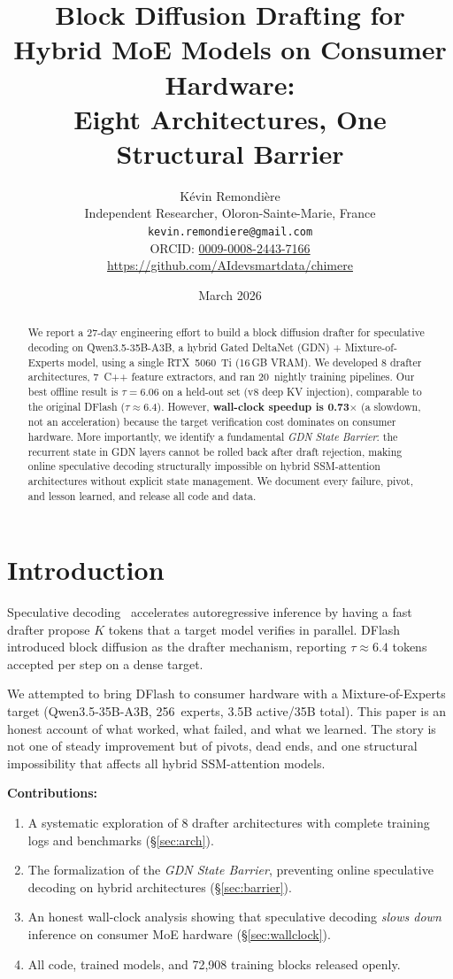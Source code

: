 \documentclass[10pt,a4paper]{article}
\title{Block Diffusion Drafting for Hybrid MoE Models on Consumer Hardware:\\Eight Architectures, One Structural Barrier}
\author{
  K\'evin Remondi\`ere\\
  Independent Researcher, Oloron-Sainte-Marie, France\\
  \texttt{kevin.remondiere@gmail.com}\\
  ORCID: \href{https://orcid.org/0009-0008-2443-7166}{0009-0008-2443-7166}\\
  \url{https://github.com/AIdevsmartdata/chimere}
}
\date{March 2026}
\begin{document}
\maketitle

\begin{abstract}
We report a 27-day engineering effort to build a block diffusion drafter for speculative decoding on Qwen3.5-35B-A3B, a hybrid Gated DeltaNet (GDN) + Mixture-of-Experts model, using a single RTX~5060~Ti (16\,GB VRAM). We developed 8 drafter architectures, 7~C++ feature extractors, and ran 20~nightly training pipelines. Our best offline result is $\tau{=}6.06$ on a held-out set (v8 deep KV injection), comparable to the original DFlash ($\tau{\approx}6.4$). However, \textbf{wall-clock speedup is 0.73$\times$} (a slowdown, not an acceleration) because the target verification cost dominates on consumer hardware. More importantly, we identify a fundamental \emph{GDN State Barrier}: the recurrent state in GDN layers cannot be rolled back after draft rejection, making online speculative decoding structurally impossible on hybrid SSM-attention architectures without explicit state management. We document every failure, pivot, and lesson learned, and release all code and data.
\end{abstract}

\section{Introduction}

Speculative decoding~\cite{leviathan2023fast} accelerates autoregressive inference by having a fast drafter propose $K$ tokens that a target model verifies in parallel. DFlash~\cite{dflash2024} introduced block diffusion as the drafter mechanism, reporting $\tau{\approx}6.4$ tokens accepted per step on a dense target.

We attempted to bring DFlash to consumer hardware with a Mixture-of-Experts target (Qwen3.5-35B-A3B, 256~experts, 3.5B active/35B total). This paper is an honest account of what worked, what failed, and what we learned. The story is not one of steady improvement but of pivots, dead ends, and one structural impossibility that affects all hybrid SSM-attention models.

\textbf{Contributions:}
\begin{enumerate}
  \item A systematic exploration of 8 drafter architectures with complete training logs and benchmarks (\S\ref{sec:arch}).
  \item The formalization of the \emph{GDN State Barrier}, preventing online speculative decoding on hybrid architectures (\S\ref{sec:barrier}).
  \item An honest wall-clock analysis showing that speculative decoding \emph{slows down} inference on consumer MoE hardware (\S\ref{sec:wallclock}).
  \item All code, trained models, and 72{,}908 training blocks released openly.
\end{enumerate}
\end{document}
